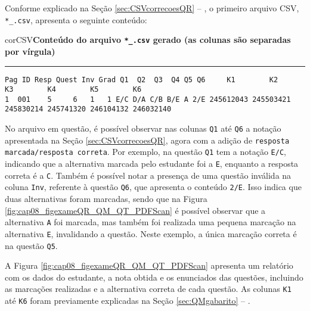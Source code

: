 Conforme explicado na Seção \ref{sec:CSVcorrecoesQR} -- , o primeiro arquivo CSV, \verb|*_.csv|, apresenta o seguinte conteúdo:


\begin{myboxCode}{corCSV}{\textbf{Conteúdo do arquivo \texttt{*\_.csv} gerado (as colunas são separadas por vírgula)}}\vspace{3mm}
\hrule
{\scriptsize
\begin{verbatim}
Pag ID Resp Quest Inv Grad Q1  Q2  Q3  Q4 Q5 Q6     K1        K2        K3        K4        K5        K6
1  001    5     6   1   1 E/C D/A C/B B/E A 2/E 245612043 245503421 245830214 245741320 246104132 246032140
\end{verbatim}
}
\end{myboxCode}



No arquivo em questão, é possível observar nas colunas \verb|Q1| até \verb|Q6| a notação apresentada na Seção \ref{sec:CSVcorrecoesQR}, agora com a adição de \verb|resposta marcada/resposta correta|. Por exemplo, na questão \verb|Q1| tem a notação \verb|E/C|, indicando que a alternativa marcada pelo estudante foi a \verb|E|, enquanto a resposta correta é a \verb|C|. Também é possível notar a presença de uma questão inválida na coluna \verb|Inv|, referente à questão \verb|Q6|, que apresenta o conteúdo \verb|2/E|. Isso indica que duas alternativas foram marcadas, sendo que na Figura \ref{fig:cap08_figexameQR_QM_QT_PDFScan} é possível observar que a alternativa \verb|A| foi marcada, mas também foi realizada uma pequena marcação na alternativa \verb|E|, invalidando a questão. Neste exemplo, a única marcação correta é na questão \verb|Q5|.

A Figura \ref{fig:cap08_figexameQR_QM_QT_PDFScan} apresenta um relatório com os dados do estudante, a nota obtida e os enunciados das questões, incluindo as marcações realizadas e a alternativa correta de cada questão. As colunas \verb|K1| até \verb|K6| foram previamente explicadas na Seção \ref{sec:QMgabarito} -- .


